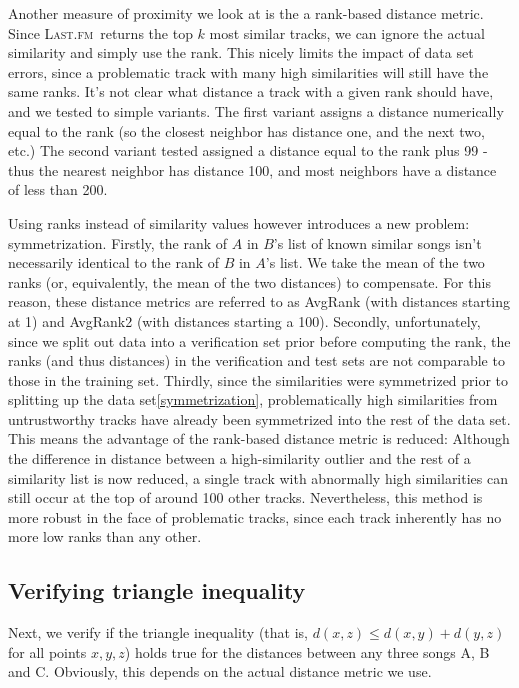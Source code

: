 \documentclass[10pt,fleqn,a4paper]{article}
\newcommand{\lastfm}{\textsc{Last.fm}}
\begin{document}
\begin{twocolumn}
Another measure of proximity we look at is the a rank-based distance metric. Since \lastfm~returns the top $k$ most similar tracks, we can ignore the actual similarity and simply use the rank. This nicely limits the impact of data set errors, since a problematic track with many high similarities will still have the same ranks.  It's not clear what distance a track with a given rank should have, and we tested to simple variants.  The first variant assigns a distance numerically equal to the rank (so the closest neighbor has distance one, and the next two, etc.)  The second variant tested assigned a distance equal to the rank plus 99 - thus the nearest neighbor has distance 100, and most neighbors have a distance of less than 200.

Using ranks instead of similarity values however introduces a new problem: symmetrization. Firstly, the rank of $A$ in $B$'s list of known similar songs isn't necessarily identical to the rank of $B$ in $A$'s list. We take the mean of the two ranks (or, equivalently, the mean of the two distances) to compensate.  For this reason, these distance metrics are referred to as AvgRank (with distances starting at 1) and AvgRank2 (with distances starting a 100).  Secondly, unfortunately, since we split out data into a verification set prior before computing the rank, the ranks (and thus distances) in the verification and test sets are not comparable to those in the training set. Thirdly, since the similarities were symmetrized prior to splitting up the data set\ref{symmetrization}, problematically high similarities from untrustworthy tracks have already been symmetrized into the rest of the data set.  This means the advantage of the rank-based distance metric is reduced: Although the difference in distance between a high-similarity outlier and the rest of a similarity list is now reduced, a single track with abnormally high similarities can still occur at the top of around 100 other tracks.  Nevertheless, this method is more robust in the face of problematic tracks, since each track inherently has no more low ranks than any other.  

\subsection{Verifying triangle inequality}

Next, we verify if the triangle inequality (that is, $d(x,z) \leq d(x,y) + d(y,z)$ for all points $x,y,z$) holds true for the distances between any three songs A, B and C. Obviously, this depends on the actual distance metric we use.


\end{twocolumn}
\end{document}
